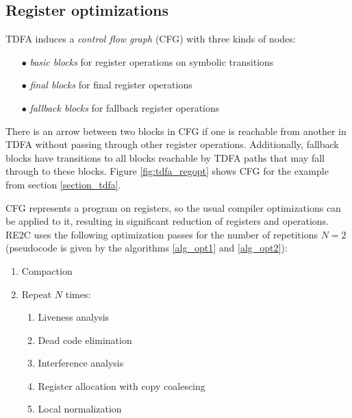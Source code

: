 \documentclass[]{article}
\begin{document}
\subsection{Register optimizations}

TDFA induces a \emph{control flow graph} (CFG) with three kinds of nodes:
\medskip

\begin{itemize}
\item[$\bullet$] \emph{basic blocks} for register operations on symbolic transitions
\item[$\bullet$] \emph{final blocks} for final register operations
\item[$\bullet$] \emph{fallback blocks} for fallback register operations
\end{itemize}
\medskip

There is an arrow between two blocks in CFG if one is reachable from another in TDFA without passing through other register operations.
Additionally, fallback blocks have transitions to all blocks reachable by TDFA paths that may fall through to these blocks.
Figure \ref{fig:tdfa_regopt} shows CFG for the example from section \ref{section_tdfa}.
\medskip

CFG represents a program on registers, so the usual compiler optimizations can be applied to it,
resulting in significant reduction of registers and operations.
RE2C uses the following optimization passes for the number of repetitions $N=2$
(pseudocode is given by the algorithms \ref{alg_opt1} and \ref{alg_opt2}):
\medskip

\begin{enumerate}
    \item Compaction
    \item Repeat $N$ times:
    \begin{enumerate}[label=\alph*.]
        \item Liveness analysis
        \item Dead code elimination
        \item Interference analysis
        \item Register allocation with copy coalescing
        \item Local normalization
    \end{enumerate}
\end{enumerate}
\medskip

\end{document}
